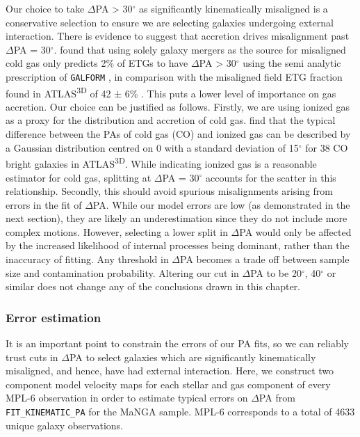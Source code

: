 Our choice to take $\Delta$PA > 30$^{\circ}$ as significantly kinematically misaligned is a conservative selection to ensure we are selecting galaxies undergoing external interaction. There is evidence to suggest that accretion drives misalignment past $\Delta$PA = 30$^{\circ}$. \citet{lagos2015} found that using solely galaxy mergers as the source for misaligned cold gas only predicts 2\% of ETGs to have $\Delta$PA > 30$^{\circ}$ using the semi analytic prescription of \texttt{GALFORM} \citep{galform}, in comparison with the misaligned field ETG fraction found in ATLAS\textsuperscript{3D} of 42 $\pm$ 6\% \citep{davis2011}. This puts a lower level of importance on gas accretion. Our choice can be justified as follows. Firstly, we are using ionized gas as a proxy for the distribution and accretion of cold gas. \citet{davis2011} find that the typical difference between the PAs of cold gas (CO) and ionized gas can be described by a Gaussian distribution centred on 0 with a standard deviation of 15$^{\circ}$ for 38 CO bright galaxies in ATLAS\textsuperscript{3D}. While indicating ionized gas is a reasonable estimator for cold gas, splitting at $\Delta$PA = 30$^{\circ}$ accounts for the scatter in this relationship. Secondly, this should avoid spurious misalignments arising from errors in the fit of $\Delta$PA. While our model errors are low (as demonstrated in the next section), they are likely an underestimation since they do not include more complex motions. However, selecting a lower split in $\Delta$PA would only be affected by the increased likelihood of internal processes being dominant, rather than the inaccuracy of fitting. Any threshold in $\Delta$PA becomes a trade off between sample size and contamination probability. Altering our cut in $\Delta$PA to be 20$^{\circ}$, 40$^{\circ}$ or similar does not change any of the conclusions drawn in this chapter.

\subsubsection{Error estimation}
It is an important point to constrain the errors of our PA fits, so we can reliably trust cuts in $\Delta$PA to select galaxies which are significantly kinematically misaligned, and hence, have had external interaction. Here, we construct two component model velocity maps for each stellar and gas component of every MPL-6 observation in order to estimate typical errors on $\Delta$PA from \texttt{FIT\_KINEMATIC\_PA} for the MaNGA sample. MPL-6 corresponds to a total of 4633 unique galaxy observations.

